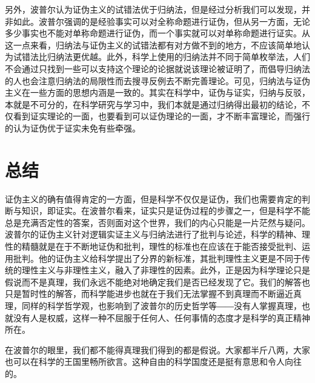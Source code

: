 \documentclass[]{article}
\begin{document}
\begin{multicols}{2}
另外，波普尔认为证伪主义的试错法优于归纳法，但是经过分析我们可以发现，并非如此。波普尔强调的是经验事实可以对全称命题进行证伪，但从另一方面，无论多少事实也不能对单称命题进行证伪，而一个事实就可以对单称命题进行证实。从这一点来看，归纳法与证伪主义的试错法都有对方做不到的地方，不应该简单地认为试错法比归纳法更优越。此外，科学上使用的归纳法并不同于简单枚举法，人们不会通过只找到一些可以支持这个理论的论据就说该理论被证明了，而倡导归纳法的人也会注意归纳法的局限性而去搜寻反例去不断完善理论。可见，归纳法与证伪主义在一些方面的思想内涵是一致的。其实在科学中，证伪与证实，归纳与反驳，本就是不可分的，在科学研究与学习中，我们本就是通过归纳得出最初的结论，不仅看到证实理论的一面，也要看到可以证伪理论的一面，才不断丰富理论，而强行的认为证伪优于证实未免有些牵强。
\section{总结}

证伪主义的确有值得肯定的一方面，但是科学不仅仅是证伪，我们也需要肯定的判断与知识，即证实。在波普尔看来，证实只是证伪过程的步骤之一，但是科学不能总是充满否定性的答案，否则面对这个世界，我们的内心只能是一片茫然与疑问。波普尔的证伪主义针对逻辑实证主义与归纳法进行了批判与论述，科学的精神、理性的精髓就是在于不断地证伪和批判，理性的标准也在应该在于能否接受批判、运用批判。他的证伪主义给科学提出了分界的新标准，其批判理性主义更是不同于传统的理性主义与非理性主义，融入了非理性的因素。此外，正是因为科学理论只是假说而不是真理，我们永远不能绝对地确定我们是否已经发现了它。我们的解答也只是暂时性的解答，而科学能进步也就在于我们无法掌握不到真理而不断逼近真理，同样的科学哲学观，也影响到了波普尔的历史哲学等――没有人掌握真理，也就没有人是权威，这样一种不屈服于任何人、任何事情的态度才是科学的真正精神所在。

在波普尔的眼里，我们都不能得真理我们得到的都是假说。大家都半斤八两，大家也可以在科学的王国里畅所欲言。这种自由的科学国度还是挺有意思和令人向往的。

\end{multicols}
\end{document}
